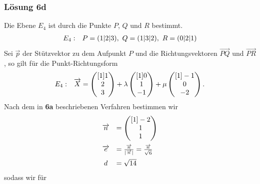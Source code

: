\subsubsection{Lösung 6d}
Die Ebene $\displaystyle E_{4}$ ist durch die Punkte $\displaystyle P$, $\displaystyle Q$ und $\displaystyle R$ bestimmt. 
\begin{equation*}
	\begin{array}{ r l }
		E_{4} : & P=( 1|2|3) ,\ Q=( 1|3|2) ,\ R=( 0|2|1)
	\end{array}
\end{equation*}
Sei $\displaystyle \vec{p}$ der Stützvektor zu dem Aufpunkt $\displaystyle P$ und die Richtungsvektoren $\displaystyle \overrightarrow{PQ}$ und $\displaystyle \overrightarrow{PR}$, so gilt für die Punkt-Richtungsform
\begin{equation*}
	\begin{array}{ r l }
		E_{4} : & \vec{X} =\begin{pmatrix}[1]
			1\\
			2\\
			3
		\end{pmatrix} +\lambda \begin{pmatrix}[1]
			0\\
			1\\
			-1
		\end{pmatrix} +\mu \begin{pmatrix}[1]
			-1\\
			0\\
			-2
		\end{pmatrix}\text{.}
	\end{array}
\end{equation*}
Nach dem in \textbf{6a }beschriebenen Verfahren bestimmen wir
\begin{equation*}
	\begin{array}{ c l }
		\vec{n} & =\begin{pmatrix}[1]
			-2\\
			1\\
			1
		\end{pmatrix}\vspace{2mm}\\
		\vec{e} & =\frac{\vec{n}}{| \vec{n}| } =\frac{\vec{n}}{\sqrt{6}}\vspace{2mm}\\
		d & =\sqrt{14}
	\end{array}
\end{equation*}
sodass wir für 
